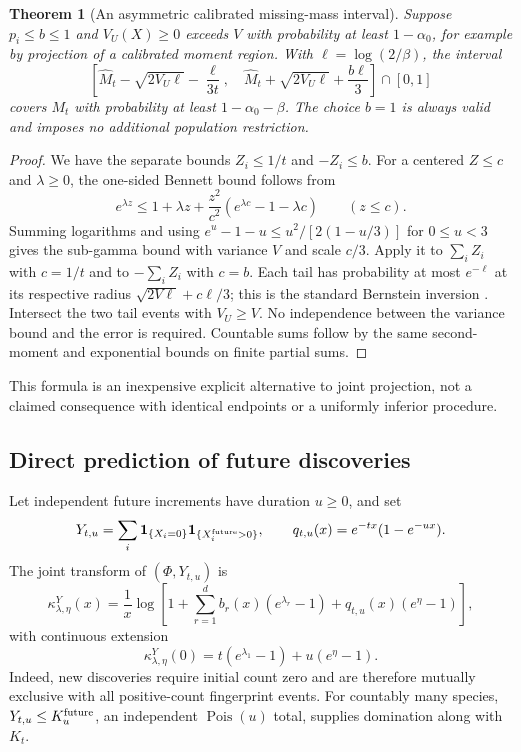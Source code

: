 \documentclass[11pt]{article}
\numberwithin{equation}{section}
\newtheorem{theorem}{Theorem}[section]
\theoremstyle{definition}
\theoremstyle{remark}
\newcommand{\ind}{\mathbf1}
\newcommand{\Pois}{\operatorname{Pois}}
\begin{document}
\begin{theorem}[An asymmetric calibrated missing-mass interval]\label{thm:missingci}
Suppose $p_i\le b\le1$ and $V_U(X)\ge0$ exceeds $V$ with probability at least $1-\alpha_0$, for example by projection of a calibrated moment region. With $\ell=\log(2/\beta)$, the interval
\begin{equation}\label{eq:missingci}
 \left[
 \widehat M_t-\sqrt{2V_U\ell}-\frac{\ell}{3t},\quad
 \widehat M_t+\sqrt{2V_U\ell}+\frac{b\ell}{3}
 \right]\cap[0,1]
\end{equation}
covers $M_t$ with probability at least $1-\alpha_0-\beta$. The choice $b=1$ is always valid and imposes no additional population restriction.
\end{theorem}
\begin{proof}
We have the separate bounds $Z_i\le1/t$ and $-Z_i\le b$. For a centered $Z\le c$ and $\lambda\ge0$, the one-sided Bennett bound follows from
\[
 e^{\lambda z}\le1+\lambda z+
 \frac{z^2}{c^2}(e^{\lambda c}-1-\lambda c)\qquad(z\le c).
\]
Summing logarithms and using $e^u-1-u\le u^2/[2(1-u/3)]$ for $0\le u<3$ gives the sub-gamma bound with variance $V$ and scale $c/3$. Apply it to $\sum_iZ_i$ with $c=1/t$ and to $-\sum_iZ_i$ with $c=b$. Each tail has probability at most $e^{-\ell}$ at its respective radius $\sqrt{2V\ell}+c\ell/3$; this is the standard Bernstein inversion \cite[Chapter 2]{Boucheron2013}. Intersect the two tail events with $V_U\ge V$. No independence between the variance bound and the error is required. Countable sums follow by the same second-moment and exponential bounds on finite partial sums.
\end{proof}
This formula is an inexpensive explicit alternative to joint projection, not a claimed consequence with identical endpoints or a uniformly inferior procedure.

\subsection{Direct prediction of future discoveries}\label{subsec:jointfuture}
Let independent future increments have duration $u\ge0$, and set
\[
 Y_{t,u}=\sum_i\ind_{\{X_i=0\}}\ind_{\{X_i^{\rm future}>0\}},\qquad
 q_{t,u}(x)=e^{-tx}(1-e^{-ux}).
\]
The joint transform of $(\Phi,Y_{t,u})$ is
\begin{equation}\label{eq:jointfuture}
 \kappa^Y_{\lambda,\eta}(x)
 =\frac1x\log\left[
 1+\sum_{r=1}^d b_r(x)(e^{\lambda_r}-1)
          +q_{t,u}(x)(e^\eta-1)\right],
\end{equation}
with continuous extension
\[
 \kappa^Y_{\lambda,\eta}(0)
 =t(e^{\lambda_1}-1)+u(e^\eta-1).
\]
Indeed, new discoveries require initial count zero and are therefore mutually exclusive with all positive-count fingerprint events. For countably many species, $Y_{t,u}\le K_u^{\rm future}$, an independent $\Pois(u)$ total, supplies domination along with $K_t$.
\end{document}
